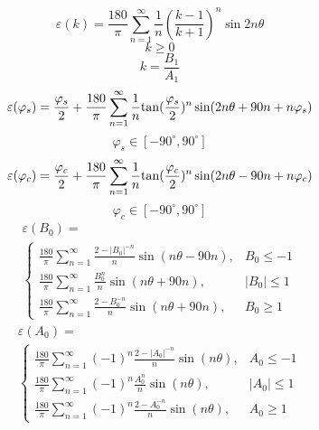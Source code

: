\documentclass[a4paper]{article}
\begin{document}
\begin{equation}
\varepsilon(k) =\frac{180}{\pi}\sum_{n=1}^{\infty}\frac{1}{n}(\frac{k-1}{k+1})^n \sin 2 n \theta
\end{equation}
\begin{equation*}
k \geq 0
\end{equation*}
\begin{equation*}
k = \frac{B_1}{A_1}
\end{equation*}
\begin{equation}
\varepsilon(\varphi_{s}) = \frac{\varphi_{s}}{2}+ \frac{180}{\pi}\sum_{n=1}^{\infty}\frac{1}{n} \mathrm{tan}(\frac{\varphi_{s}}{2})^n \sin (2n \theta+90 n +n \varphi_{s})\\
\end{equation}
\begin{equation*}
\varphi_{s} \in [-90^\circ, 90^\circ]
\end{equation*}
\begin{equation}
\varepsilon(\varphi_{c}) = \frac{\varphi_{c}}{2}+ \frac{180}{\pi}\sum_{n=1}^{\infty}\frac{1}{n} \mathrm{tan}(\frac{\varphi_{c}}{2})^n \sin (2n \theta-90 n +n \varphi_{c})\\
\end{equation}
\begin{equation*}
\varphi_{c} \in [-90^\circ, 90^\circ]
\end{equation*}
\begin{multline}
\varepsilon(B_0)=\\
\begin{cases}
\frac{180}{\pi}\sum_{n=1}^{\infty}\frac{2-|B_0|^{-n}}{n} \sin (n \theta -  90 n), & B_0\leq -1 \\
\frac{180}{\pi}\sum_{n=1}^{\infty}\frac{B_0^n}{n} \sin (n \theta + 90 n), & |B_0|\leq 1 \\
\frac{180}{\pi}\sum_{n=1}^{\infty}\frac{2-B_0^{-n}}{n} \sin (n \theta + 90 n), & B_0\geq 1
\end{cases}
\end{multline}
\begin{multline}
\varepsilon(A_0)=\\
\begin{cases}
\frac{180}{\pi}\sum_{n=1}^{\infty}(-1)^n\frac{2-|A_0|^{-n}}{n} \sin (n \theta ), & A_0\leq -1 \\
\frac{180}{\pi}\sum_{n=1}^{\infty}(-1)^n\frac{A_0^n}{n} \sin (n \theta ), & |A_0|\leq 1 \\
\frac{180}{\pi}\sum_{n=1}^{\infty}(-1)^n\frac{2-A_0^{-n}}{n} \sin (n \theta ), & A_0\geq 1
\end{cases}
\end{multline}
\end{document}
